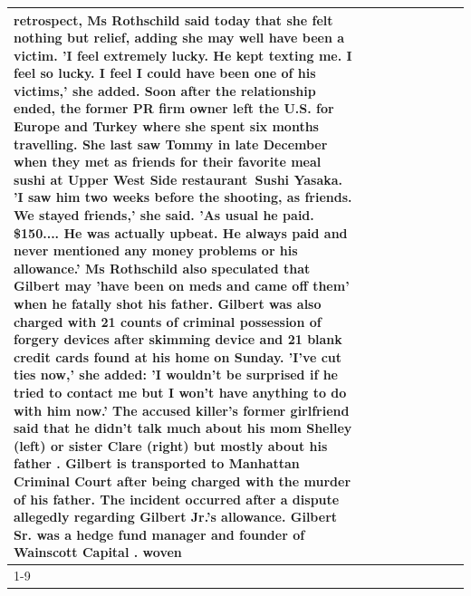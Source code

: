 \begin{table}[H]
\begin{tabular}{lllrlllll}
retrospect, Ms Rothschild said today that she felt nothing but relief, adding she may well have been a victim. 'I feel extremely lucky. He kept texting me. I feel so lucky. I feel I could have been one of his victims,' she added. Soon after the relationship ended, the former PR firm owner left the U.S. for Europe and Turkey where she spent six months  travelling. She last saw Tommy in late December when they met as friends for their favorite meal sushi at Upper West Side restaurant Sushi Yasaka. 'I saw him two weeks before the shooting, as friends. We stayed friends,' she said. 'As usual he paid. \$150.... He was actually upbeat. He always paid and never mentioned any money problems or his allowance.' Ms Rothschild also speculated that Gilbert may 'have been on meds and came off them' when he fatally shot his father. Gilbert was also charged with 21 counts of criminal possession of forgery devices after skimming device and 21 blank credit cards found at his home on Sunday. 'I've cut ties now,' she added: 'I wouldn’t be surprised if he tried to contact me but I won’t have anything to do with him now.' The accused killer's former girlfriend said that he didn't talk much about his mom Shelley (left) or sister Clare (right) but mostly about his father . Gilbert is transported to Manhattan Criminal Court  after being charged with the murder of his father. The incident occurred after a dispute allegedly regarding Gilbert Jr.'s allowance. Gilbert Sr. was a hedge fund manager and founder of Wainscott Capital . woven \\
\cline{1-9} \cline{2-9}

\end{tabular}
\end{table}
